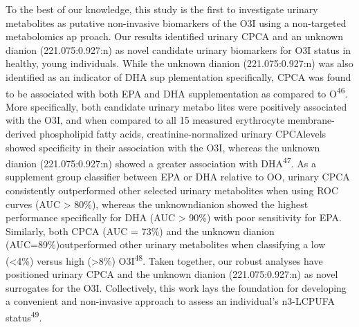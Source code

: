 \documentclass[journal=jacsat,manuscript=article]{achemso}
\begin{document}
To the best of our knowledge, this study is the first to investigate
urinary metabolites as putative non-invasive biomarkers of the O3I using
a non-targeted metabolomics ap proach. Our results identified urinary
CPCA and an unknown dianion (221.075:0.927:n) as novel candidate urinary
biomarkers for O3I status in healthy, young individuals. While the
unknown dianion (221.075:0.927:n) was also identified as an indicator of
DHA sup plementation specifically, CPCA was found to be associated with
both EPA and DHA supplementation as compared to O\textsuperscript{46}.
More specifically, both candidate urinary metabo lites were positively
associated with the O3I, and when compared to all 15 measured
erythrocyte membrane-derived phospholipid fatty acids,
creatinine-normalized urinary CPCAlevels showed specificity in their
association with the O3I, whereas the unknown dianion (221.075:0.927:n)
showed a greater association with DHA\textsuperscript{47}. As a
supplement group classifier between EPA or DHA relative to OO, urinary
CPCA consistently outperformed other selected urinary metabolites when
using ROC curves (AUC \textgreater{} 80\%), whereas the unknowndianion
showed the highest performance specifically for DHA (AUC \textgreater{}
90\%) with poor sensitivity for EPA. Similarly, both CPCA (AUC = 73\%)
and the unknown dianion (AUC=89\%)outperformed other urinary metabolites
when classifying a low (\textless4\%) versus high (\textgreater8\%)
O3I\textsuperscript{48}. Taken together, our robust analyses have
positioned urinary CPCA and the unknown dianion (221.075:0.927:n) as
novel surrogates for the O3I. Collectively, this work lays the
foundation for developing a convenient and non-invasive approach to
assess an individual's n3-LCPUFA status\textsuperscript{49}.
\end{document}
